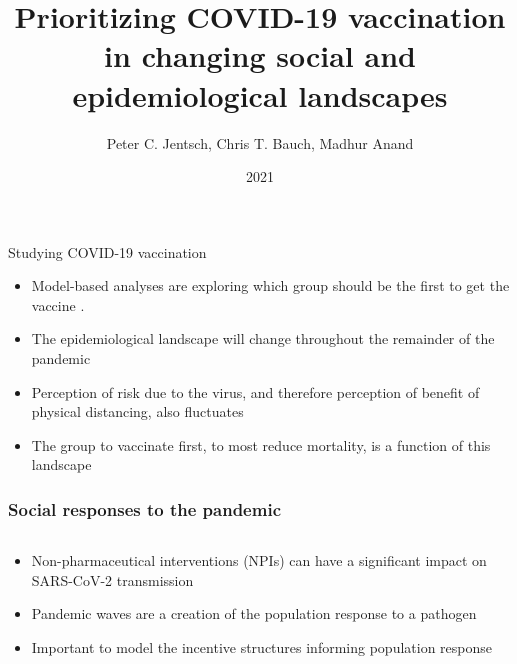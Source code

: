 \documentclass{beamer}
\title{Prioritizing COVID-19 vaccination in changing social and epidemiological landscapes}
\author{Peter C. Jentsch, Chris T. Bauch, Madhur Anand}
\institute{University Of Waterloo}
\date{2021}
\begin{document}

\begin{frame}{Studying COVID-19 vaccination}
    \begin{itemize}
        \item Model-based analyses are exploring which group should be the first to get the vaccine \cite{bubar2020model,hoyt2020vaccine}.
        \item The epidemiological landscape will change throughout the remainder of the pandemic
        \item Perception of risk due to the virus, and therefore perception of benefit of physical distancing, also fluctuates 
        \item The group to vaccinate first, to most reduce mortality, is a function of this landscape
    \end{itemize}
\end{frame}

\begin{frame}
\frametitle{Social responses to the pandemic}
\begin{columns}
    \begin{column}{\textwidth}
    \begin{itemize}
        \item Non-pharmaceutical interventions (NPIs) can have a significant impact on SARS-CoV-2 transmission 
        \item Pandemic waves are a creation of the population response to a pathogen
        \item Important to model the incentive structures informing population response
    \end{itemize}
    \end{column}
\end{columns}
\end{frame}
\end{document}
